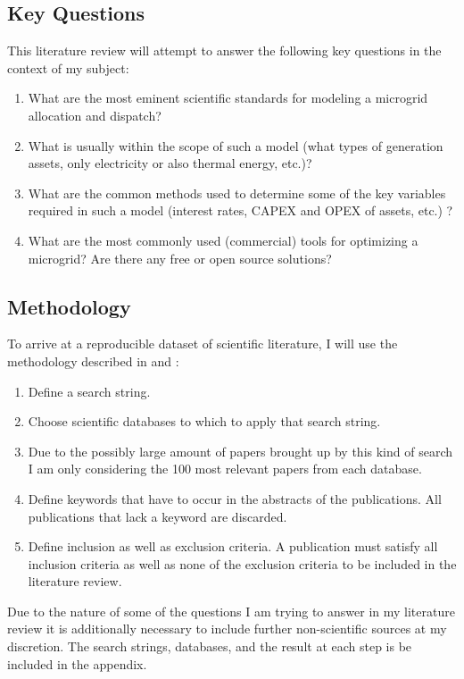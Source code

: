 \documentclass[
	11pt,								%
	DIV10,								%
	a4paper,         					%
	oneside,							%
	headheight=20pt,					%
	footheight=20pt,					%
    parskip=full,						%
    listof=totoc,						%
	bibliography=totoc,					%
	index=totoc,						%
]{scrartcl}
\begin{document}
\subsection{Key Questions}
This literature review will attempt to answer the following key questions in the context of my subject:
\begin{enumerate}
	\item What are the most eminent scientific standards for modeling a microgrid allocation and dispatch?
	\item What is usually within the scope of such a model (what types of generation assets, only electricity or also thermal energy, etc.)? 
	\item What are the common methods used to determine some of the key variables required in such a model (interest rates, CAPEX and OPEX of assets, etc.) ?
	\item What are the most commonly used (commercial) tools for optimizing a microgrid? Are there any free or open source solutions? 
\end{enumerate} 

\subsection{Methodology}
To arrive at a reproducible dataset of scientific literature, I will use the methodology described in \cite{petersenSystematicMappingStudies} and \cite{pop00975}:

\begin{enumerate}
	\item Define a search string.
	\item Choose scientific databases to which to apply that search string.
	\item Due to the possibly large amount of papers brought up by this kind of search I am only considering the 100 most relevant papers from each database.
	\item Define keywords that have to occur in the abstracts of the publications. All publications that lack a keyword are discarded.
	\item Define inclusion as well as exclusion criteria. A publication must satisfy all inclusion criteria as well as none of the exclusion criteria to be included in the literature review.
\end{enumerate}
Due to the nature of some of the questions I am trying to answer in my literature review it is additionally necessary to include further non-scientific sources at my discretion.
The search strings, databases, and the result at each step is be included in the appendix.
\end{document}
